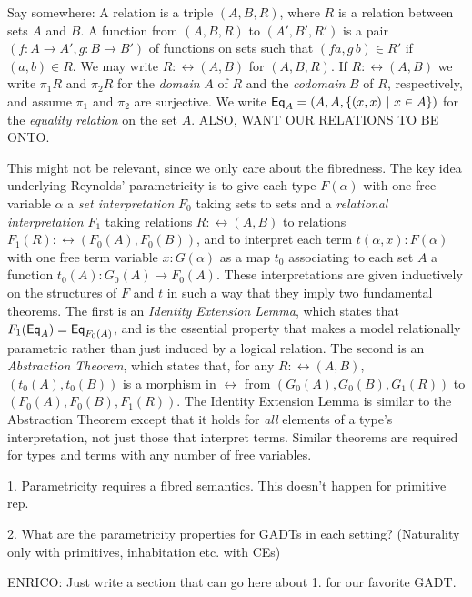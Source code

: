 \documentclass[acmsmall,screen,review,anonymous]{acmart}
\theoremstyle{definition}
\begin{document}
{\color{blue} Say somewhere: A relation is a triple $(A,B,R)$, where
  $R$ is a relation between sets $A$ and $B$.  A function from
  $(A,B,R)$ to $(A',B',R')$ is a pair $(f : A \to A',g : B \to B')$ of
  functions on sets such that $(f a,g\,b) \in R'$ if $(a,b) \in R$. We
  may write $R : \rel(A,B)$ for $(A,B,R)$.  If $R : \rel(A,B)$ we
  write $\pi_1 R$ and $\pi_2 R$ for the {\em domain} $A$ of $R$ and
  the {\em codomain} $B$ of $R$, respectively, and assume $\pi_1$ and
  $\pi_2$ are surjective. We write $\mathsf{Eq}_A = (A,A,\{(x,x)~|~ x \in
  A\})$ for the {\em equality relation} on the set $A$. ALSO, WANT OUR
RELATIONS TO BE ONTO.}

{\color{red} This might not be relevant, since we only care about the
  fibredness.} 
The key idea underlying Reynolds' parametricity is to give each type
$F(\alpha)$ with one free variable $\alpha$ a {\em set interpretation}
$F_0$ taking sets to sets and a \emph{relational interpretation} $F_1$
taking relations $R : \rel(A,B)$ to relations $F_1 (R) : \rel(F_0 (A),
F_0 (B))$, and to interpret each term $t(\alpha,x) : F(\alpha)$ with
one free term variable $x : G(\alpha)$ as a map $t_0$ associating to
each set $A$ a function $t_0(A) : G_0(A) \to F_0(A)$. These
interpretations are given inductively on the structures of $F$ and $t$
in such a way that they imply two fundamental theorems. The first is
an \emph{Identity Extension Lemma}, which states that $F_1(\mathsf{Eq}_A) =
\mathsf{Eq}_{F_0(A)}$, and is the essential property that makes a model
relationally parametric rather than just induced by a logical
relation. The second is an \emph{Abstraction Theorem}, which states
that, for any $R :\rel(A, B)$, $(t_0(A),t_0(B))$ is a morphism in
$\rel$ from $(G_0(A),G_0(B),G_1(R))$ to $(F_0(A),F_0(B),F_1(R))$. The
Identity Extension Lemma is similar to the Abstraction Theorem except
that it holds for {\em all} elements of a type's interpretation, not
just those that interpret terms.  Similar theorems are required for
types and terms with any number of free variables.

1. Parametricity requires a fibred semantics. This doesn't happen for
primitive rep.

2. What are the parametricity properties for GADTs in each setting?
(Naturality only with primitives, inhabitation etc. with CEs)

{\color{red} ENRICO: Just write a section that can go here about
  1. for our favorite GADT.}

\vspace*{1in}
\end{document}

